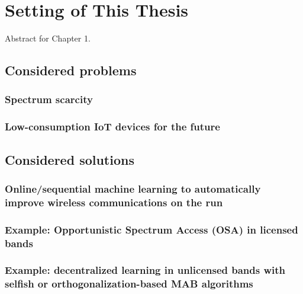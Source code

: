 
\chapter{Setting of This Thesis}
\label{chapter:1}
\minitoc

Abstract for Chapter 1.


\newpage
\graphicspath{{2-Chapters/1-Chapter/Images/}}

\section{Considered problems}
\label{sec:1:problems}


\subsection{Spectrum scarcity}


\subsection{Low-consumption IoT devices for the future}


\section{Considered solutions}
\label{sec:1:solutions}



\subsection{Online/sequential machine learning to automatically improve wireless communications on the run}

\subsection{Example: Opportunistic Spectrum Access (OSA) in licensed bands}

\subsection{Example: decentralized learning in unlicensed bands with selfish or orthogonalization-based MAB algorithms}


